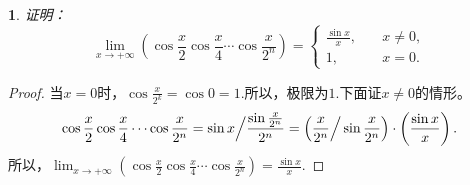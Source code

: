 \documentclass[utf8]{book}
\newtheorem{example}{}[section]             %
\begin{document}
\begin{example}
证明：$$\displaystyle\lim_{x\to +\infty}\left(\cos{\frac{x}{2}}\cos{\frac{x}{4}}\cdots\cos{\frac{x}{2^n}}\right)=
\begin{cases}
\displaystyle\frac{\sin{x}}{x},\quad&x\neq 0,\\
1,\quad&x=0.
\end{cases}
$$
\end{example}
\begin{proof}
当$x=0$时，$\cos{\frac{x}{2^k}}=\cos{0}=1$.所以，极限为$1$.下面证$x\neq 0$的情形。
$$\cos{\frac{x}{2}}\cos{\frac{x}{4}}\cdots\cos{\frac{x}{2^n}}=\sin{x}\Big{/}\frac{\sin{\frac{x}{2^n}}}{2^n}=\left(\frac{x}{2^n}\Big{/}\sin{\frac{x}{2^n}}\right)\cdot\left(\frac{\sin{x}}{x}\right).$$
所以，$\displaystyle\lim_{x\to +\infty}\left(\cos{\frac{x}{2}}\cos{\frac{x}{4}}\cdots\cos{\frac{x}{2^n}}\right)=\frac{\sin{x}}{x}$.
\end{proof}
\end{document}
